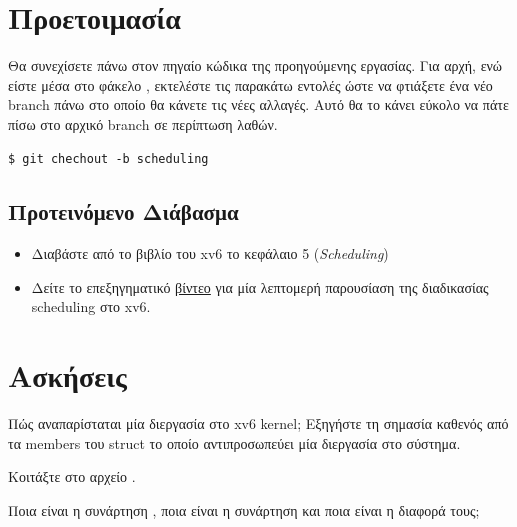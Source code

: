 \documentclass[18pt]{extarticle}
\begin{document}
\section{Προετοιμασία}

Θα συνεχίσετε πάνω στον πηγαίο κώδικα της προηγούμενης εργασίας. 
Για αρχή, ενώ είστε μέσα στο φάκελο , εκτελέστε τις παρακάτω  εντολές
ώστε να φτιάξετε ένα νέο branch πάνω στο οποίο θα κάνετε τις νέες αλλαγές. Αυτό 
θα το κάνει εύκολο να πάτε πίσω στο αρχικό branch σε περίπτωση λαθών.

\begin{commandline}
\begin{verbatim}
$ git chechout -b scheduling 
\end{verbatim}
\end{commandline}

\subsection{Προτεινόμενο Διάβασμα}

\begin{itemize}

    \item Διαβάστε από το βιβλίο του xv6 \cite{xv6Book} το κεφάλαιο 5 (\textit{Scheduling})
    \item Δείτε το επεξηγηματικό \href{https://www.youtube.com/watch?v=-O_JX5mMMHY}{βίντεο} για μία λεπτομερή παρουσίαση της διαδικασίας scheduling στο xv6.

\end{itemize}

\section{Ασκήσεις}

\begin{question}
    Πώς αναπαρίσταται μία διεργασία στο xv6 kernel;
    Εξηγήστε τη σημασία καθενός από τα members του struct 
    το οποίο αντιπροσωπεύει μία διεργασία στο σύστημα.

    \begin{info}[Σημείωση:]
        Κοιτάξτε στο αρχείο .
    \end{info}
\end{question}

\begin{question}
    Ποια είναι η συνάρτηση , ποια είναι η συνάρτηση  και ποια είναι η διαφορά τους;
\end{question}
\end{document}

